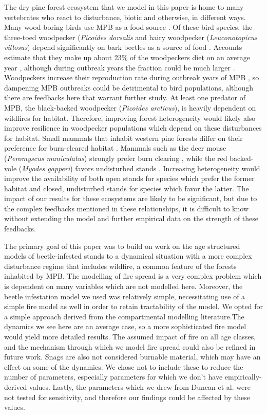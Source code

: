 The dry pine forest ecosystem that we model in this paper is home to many vertebrates who react to disturbance, biotic and otherwise, in different ways. Many wood-boring birds use MPB as a food source \cite{norris2008mountain,powell2002measuring}. Of these bird species, the three-toed woodpecker (\textit{Picoides dorsalis} and hairy woodpecker (\textit{Leuconotopicus villosus}) depend significantly on bark beetles as a source of food \cite{leatherman2012mountain}. Accounts estimate that they make up about 23\% of the woodpeckers diet on an average year \cite{beal1911food}, although during outbreak years the fraction could be much larger \cite{leatherman2012mountain}. Woodpeckers increase their reproduction rate during outbreak years of MPB \cite{edworthy2011woodpeckers}, so dampening MPB outbreaks could be detrimental to bird populations, although there are feedbacks here that warrant further study. At least one predator of MPB, the black-backed woodpecker (\textit{Picoides arcticus}), is heavily dependent on wildfires for habitat. Therefore, improving forest heterogeneity would likely also improve resilience in woodpecker populations which depend on these disturbances for habitat. Small mammals that inhabit western pine forests differ on their preference for burn-cleared habitat \cite{zwolak2009meta}. Mammals such as the deer mouse (\textit{Peromyscus maniculatus}) strongly prefer burn clearing \cite{zwolak2008deer}, while the red backed-vole (\textit{Myodes gapperi}) favors undisturbed stands \cite{zwolak2009meta}. Increasing heterogeneity would improve the availability of both open stands for species which prefer the former habitat and closed, undisturbed stands for species which favor the latter. The impact of our results for these ecosystems are likely to be significant, but due to the complex feedbacks mentioned in these relationships, it is difficult to know without extending the model and further empirical data on the strength of these feedbacks.

The primary goal of this paper was to build on work on the age structured models of beetle-infested stands\cite{duncan2015model} to a dynamical situation with a more complex disturbance regime that includes wildfire, a common feature of the forests inhabited by MPB. The modelling of fire spread is a very complex problem which is dependent on many variables which are not modelled here.  Moreover, the beetle infestation model we used was relatively simple, necessitating use of a simple fire model as well in order to retain tractability of the model. We opted for a simple approach derived from the compartmental modelling literature.The dynamics we see here are an average case, so a more sophisticated fire model would yield more detailed results. The assumed impact of fire on all age classes, and the mechanism through which we model fire spread could also be refined in future work. Snags are also not considered burnable material, which may have an effect on some of the dynamics. We chose not to include these to reduce the number of parameters, especially parameters for which we don't have empirically-derived values. Lastly, the parameters which we drew from Duncan et al. \cite{duncan2015model} were not tested for sensitivity, and therefore our findings could be affected by these values. 

